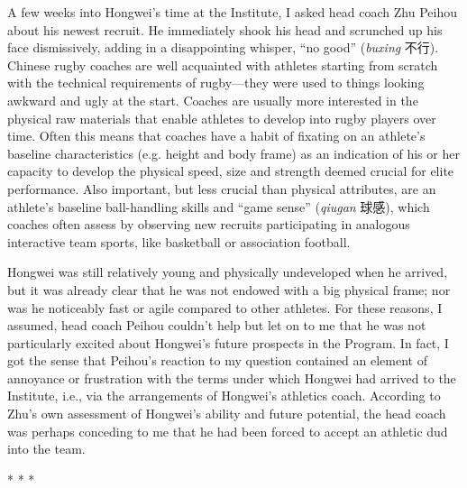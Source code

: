 \begin{CJK}{UTF8}{gbsn}

A few weeks into Hongwei’s time at the Institute, I asked head coach Zhu Peihou about his newest recruit.  He immediately shook his head and scrunched up his face dismissively, adding in a disappointing whisper, ``no good'' (\textit{buxing} 不行).  Chinese rugby coaches are well acquainted with athletes starting from scratch with the technical requirements of rugby---they were used to things looking awkward and ugly at the start.  Coaches are usually more interested in the physical raw materials that enable athletes to develop into rugby players over time.  Often this means that coaches have a habit of fixating on an athlete's baseline characteristics (e.g. height and body frame) as an indication of his or her capacity to develop the physical speed, size and strength deemed crucial for elite performance.  Also important, but less crucial than physical attributes, are an athlete’s baseline ball-handling skills and ``game sense'' (\textit{qiugan} 球感), which coaches often assess by observing new recruits participating in analogous interactive team sports, like basketball or association football.

Hongwei was still relatively young and physically undeveloped when he arrived, but it was already clear that he was not endowed with a big physical frame; nor was he noticeably fast or agile compared to other athletes.  For these reasons, I assumed, head coach Peihou couldn’t help but let on to me that he was not particularly excited about Hongwei's future prospects in the Program.  In fact, I got the sense that Peihou's reaction to my question contained an element of annoyance or frustration with the terms under which Hongwei had arrived to the Institute, i.e., via the arrangements of Hongwei’s athletics coach.  According to Zhu's own assessment of Hongwei's ability and future potential, the head coach was perhaps conceding to me that he had been forced to accept an athletic dud into the team.

                        \begin{center}
                          * * *
                        \end{center}


\end{CJK}
